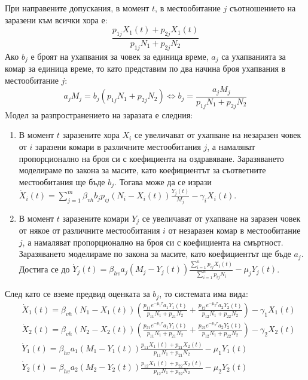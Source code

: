 При направените допускания, в момент $t$, в местообитание $j$ съотношението на заразени към всички хора е:
\begin{equation}
  \frac{p_{1j} X_1(t) + p_{2j} X_1(t)}{p_{1j} N_1 + p_{2j} N_2}
\end{equation}
Ако $b_j$ е броят на ухапвания за човек за единица време, $a_j$ са ухапванията за комар за единица време, то като представим по два начина броя ухапвания в местообитание $j$:
\begin{equation}
  a_j M_j = b_j (p_{1j} N_1 + p_{2j} N_2) \iff b_j = \frac{a_j M_j}{p_{1j} N_1 + p_{2j} N_2}
\end{equation}
Mодел за разпространението на заразата е следния:
\begin{enumerate}
  \item В момент $t$ заразените хора $X_i$ се увеличават от ухапване на незаразен човек от $i$ заразени комари в различните местообитания $j$, а намаляват пропорционално на броя си с коефициента на оздравяване. Заразяването моделираме по закона за масите, като коефициентът за съответните местообитания ще бъде $b_j$. Тогава може да се изрази $\dot{X}_i(t) = \sum_{j=1}^{m} \beta_{vh} b_j p_{ij} (N_i - X_i(t)) \frac{Y_j(t)}{M_j} - \gamma_i X_i(t)$.
  \item В момент $t$ заразените комари $Y_j$ се увеличават от ухапване на заразен човек от някое от различните местообитания $i$ от незаразен комар в местообитание $j$, а намаляват пропорционално на броя си с коефициента на смъртност. Заразяването моделираме по закона за масите, като коефициентът ще бъде $a_j$. Достига се до $\dot{Y}_j(t) = \beta_{hv} a_j (M_j - Y_j(t)) \frac{\sum_{i=1}^n p_{ij} X_i(t)}{\sum_{i=1}^n p_{ij} N_i} - \mu_j Y_j(t)$.
\end{enumerate}
След като се вземе предвид оценката за $b_j$, то системата има вида:
\begin{equation}
  \label{eq:MigrationProblem}
  \begin{split}
    &\dot{X}_1(t) = \beta_{vh} (N_1-X_1(t)) \left(\frac{p_{11} e^{-\mu_1 \tau} a_1  Y_1(t)}{p_{11} N_1 + p_{21} N_2} + \frac{p_{12} e^{-\mu_2 \tau} a_2  Y_2(t)}{p_{12} N_1 + p_{22} N_2}\right) - \gamma_1 X_1(t) \\
    &\dot{X}_2(t) = \beta_{vh} (N_2-X_2(t)) \left(\frac{p_{21} e^{-\mu_1 \tau} a_1  Y_1(t)}{p_{11} N_1 + p_{21} N_2} + \frac{p_{22} e^{-\mu_2 \tau} a_2  Y_2(t)}{p_{12} N_1 + p_{22} N_2}\right) - \gamma_2 X_2(t) \\
    &\dot{Y}_1(t) = \beta_{hv} a_1 (M_1-Y_1(t)) \frac{p_{11}  X_1(t) + p_{21}  X_2(t)}{p_{11} N_1 + p_{21} N_2} - \mu_1 Y_1(t) \\
    &\dot{Y}_2(t) = \beta_{hv} a_2 (M_2-Y_2(t)) \frac{p_{12}  X_1(t) + p_{22}  X_2(t)}{p_{12} N_1 + p_{22} N_2} - \mu_2 Y_2(t) \\
  \end{split}
\end{equation}

